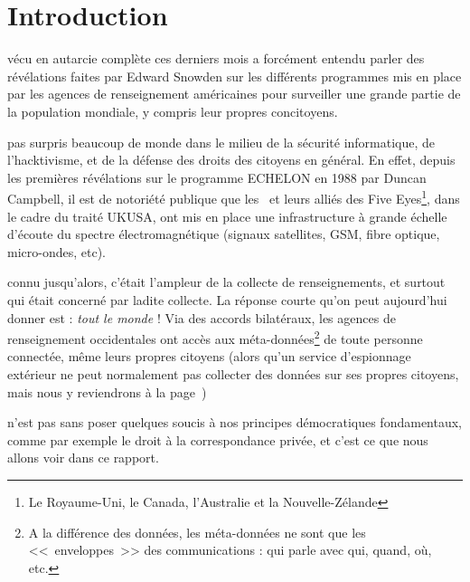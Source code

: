 \chapter{Introduction}
\label{ch:intro}

 vécu en autarcie complète ces derniers
mois a forcément entendu parler des révélations faites par Edward Snowden sur les
différents programmes mis en place par les agences de renseignement américaines
pour surveiller une grande partie de la population mondiale, y compris leur
propres concitoyens.

 pas surpris beaucoup de monde dans le milieu
de la sécurité informatique, de l'hacktivisme, et de la défense des droits des
citoyens en général. En effet, depuis les premières révélations sur le
programme ECHELON en 1988 par Duncan Campbell\autocite{Campbell1988}, il est de
notoriété publique que les \EUA~et leurs alliés des Five Eyes\footnote{Le
Royaume-Uni, le Canada, l’Australie et la Nouvelle-Zélande}, dans le cadre du
traité UKUSA, ont mis en place une infrastructure à grande échelle d'écoute du
spectre électromagnétique (signaux satellites, GSM, fibre optique, micro-ondes,
etc). 

 connu jusqu'alors, c'était l'ampleur de la
collecte de renseignements, et surtout qui était concerné par ladite collecte.
La réponse courte qu'on peut aujourd'hui donner est : \emph{tout le monde} ! Via
des accords bilatéraux, les agences de renseignement occidentales ont accès aux
méta-données\footnote{A la différence des données, les méta-données ne
sont que les <<~enveloppes~>> des communications : qui parle avec qui,
quand, où, etc.} de toute personne connectée, même leurs propres citoyens
(alors qu'un service d'espionnage extérieur ne peut normalement pas collecter
des données sur ses propres citoyens, mais nous y reviendrons à la
page~\pageref{impact})

 n'est pas sans poser quelques soucis à nos
principes démocratiques fondamentaux, comme par exemple le droit à la correspondance
privée\autocite{CEDH}, et c'est ce que nous allons voir dans ce rapport.
